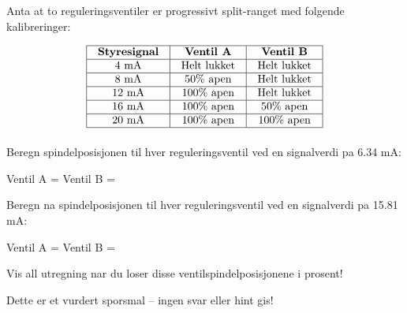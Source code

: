 

Anta at to reguleringsventiler er progressivt split-ranget med folgende kalibreringer:


$$\vbox{\offinterlineskip
\halign{\strut
\vrule \quad\hfil # \ \hfil & 
\vrule \quad\hfil # \ \hfil & 
\vrule \quad\hfil # \ \hfil \vrule \cr
\noalign{\hrule}
%
{\bf Styresignal} & {\bf Ventil A} & {\bf Ventil B} \cr
%
\noalign{\hrule}
%
4 mA & Helt lukket & Helt lukket \cr
%
\noalign{\hrule}
%
8 mA & 50\% apen & Helt lukket \cr
%
\noalign{\hrule}
%
12 mA & 100\% apen & Helt lukket \cr
%
\noalign{\hrule}
%
16 mA & 100\% apen & 50\% apen \cr
%
\noalign{\hrule}
%
20 mA & 100\% apen & 100\% apen \cr
%
\noalign{\hrule}
} %
}$$ %

\vskip 10pt

Beregn spindelposisjonen til hver reguleringsventil ved en signalverdi pa 6.34 mA:

\vskip 10pt

Ventil A = \underbar{\hskip 50pt} \hskip 50pt Ventil B = \underbar{\hskip 50pt}

\vskip 150pt

Beregn na spindelposisjonen til hver reguleringsventil ved en signalverdi pa 15.81 mA:

\vskip 10pt

Ventil A = \underbar{\hskip 50pt} \hskip 50pt Ventil B = \underbar{\hskip 50pt}

\vfil 

Vis all utregning nar du loser disse ventilspindelposisjonene i prosent!

\eject






Dette er et vurdert sporsmal -- ingen svar eller hint gis!







